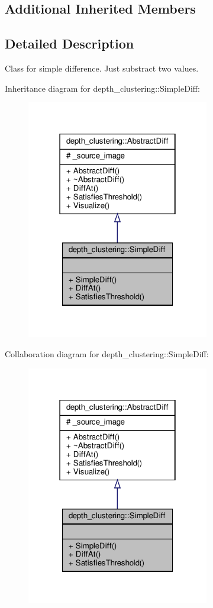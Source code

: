 \subsection*{Additional Inherited Members}


\subsection{Detailed Description}
Class for simple difference. Just substract two values. 

Inheritance diagram for depth\+\_\+clustering\+:\+:Simple\+Diff\+:\nopagebreak
\begin{figure}[H]
\begin{center}
\leavevmode
\includegraphics[width=226pt]{classdepth__clustering_1_1SimpleDiff__inherit__graph}
\end{center}
\end{figure}


Collaboration diagram for depth\+\_\+clustering\+:\+:Simple\+Diff\+:\nopagebreak
\begin{figure}[H]
\begin{center}
\leavevmode
\includegraphics[width=226pt]{classdepth__clustering_1_1SimpleDiff__coll__graph}
\end{center}
\end{figure}


